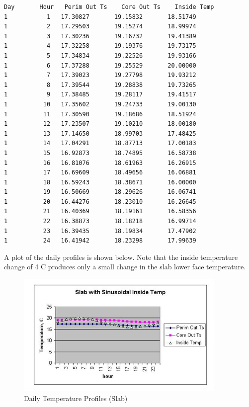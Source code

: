 \begin{lstlisting}
Day       Hour   Perim Out Ts    Core Out Ts    Inside Temp
1           1   17.30827       19.15832       18.51749
1           2   17.29503       19.15274       18.99974
1           3   17.30236       19.16732       19.41389
1           4   17.32258       19.19376       19.73175
1           5   17.34834       19.22526       19.93166
1           6   17.37288       19.25529       20.00000
1           7   17.39023       19.27798       19.93212
1           8   17.39544       19.28838       19.73265
1           9   17.38485       19.28117       19.41517
1          10   17.35602       19.24733       19.00130
1          11   17.30590       19.18686       18.51924
1          12   17.23507       19.10210       18.00180
1          13   17.14650       18.99703       17.48425
1          14   17.04291       18.87713       17.00183
1          15   16.92873       18.74895       16.58738
1          16   16.81076       18.61963       16.26915
1          17   16.69609       18.49656       16.06881
1          18   16.59243       18.38671       16.00000
1          19   16.50669       18.29626       16.06741
1          20   16.44276       18.23010       16.26645
1          21   16.40369       18.19161       16.58356
1          22   16.38873       18.18218       16.99714
1          23   16.39435       18.19834       17.47902
1          24   16.41942       18.23298       17.99639
\end{lstlisting}

A plot of the daily profiles is shown below. Note that the inside temperature change of 4 C produces only a small change in the slab lower face temperature.

\begin{figure}[hbtp] %
\centering
\includegraphics[width=0.9\textwidth, height=0.9\textheight, keepaspectratio=true]{media/image017.jpg}
\caption{Daily Temperature Profiles (Slab) \protect \label{fig:daily-temperature-profiles-slab}}
\end{figure}

